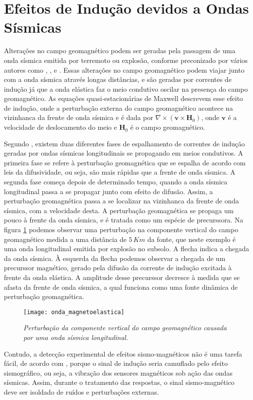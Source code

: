 \section{Efeitos de Indu\c{c}\~ao devidos a Ondas S\'ismicas}

Altera\c{c}\~oes no campo geomagn\'etico podem ser geradas  pela passagem de uma onda s\'ismica emitida por terremoto ou explos\~ao, conforme preconizado por v\'arios autores como \cite{knopoff_55}, \cite{eringen_1963}, \cite{guglielmi_86a} e \cite{guglielmi_86b}. Essas altera\c{c}\~oes no campo geomagn\'etico podem viajar junto com a onda s\'ismica atrav\'es longas dist\^ancias, e s\~ao geradas por correntes de indu\c{c}\~ao j\'a que a onda el\'astica faz o meio condutivo oscilar na presen\c{c}a do campo geomagn\'etico. As equa\c{c}\~oes quasi-estacion\'arias de Maxwell descrevem esse efeito de indu\c{c}\~ao, onde a perturba\c{c}\~ao externa do campo geomagn\'etico acontece na vizinhanca da frente de onda s\'ismica e \'e dada por $\nabla\times(\mathbf{v}\times\mathbf{H}_0)$, onde $\mathbf{v}$ \'e a velocidade de deslocamento do meio e $\mathbf{H}_0$ \'e o campo geomagn\'etico. 

Segundo \cite{surkov_89b}, existem duas diferentes fases de espalhamento de correntes de indu\c{c}\~ao geradas por ondas s\'ismicas longitudinais se propagando em meios condutivos. A primeira fase se refere \`a perturba\c{c}\~ao geomagn\'etica que se espalha de acordo com leis da difusividade, ou seja, s\~ao mais r\'apidas que a frente de onda s\'ismica. A segunda fase come\c{c}a depois de determinado tempo, quando a onda s\'ismica longitudinal passa a se propagar junto com efeito de difus\~ao. Assim, a perturba\c{c}\~ao geomagn\'etica passa a se localizar na vizinhanca da frente de onda s\'ismica, com a velocidade desta. A perturba\c{c}\~ao geomagn\'etica se propaga um pouco \`a frente da onda s\'ismica, e \'e tratada como um esp\'ecie de precurssora. Na figura \ref{fig.onda_magnetoelastica} podemos observar uma perturba\c{c}\~ao na componente vertical do campo geomagn\'etico medida a uma dist\^ancia de $5\,Km$ da fonte, que neste exemplo \'e uma onda longitudinal emitida por explos\~ao no subsolo. A flecha indica a chegada da onda s\'ismica. \`A esquerda da flecha podemos observar a chegada de um precurssor magn\'etico, gerado pela difus\~ao da corrente de indu\c{c}\~ao excitada \`a frente da onda el\'astica. A amplitude desse precurssor decresce \`a medida que se afasta da frente de onda s\'ismica, a qual funciona como uma fonte din\^amica de perturba\c{c}\~ao geomagn\'etica.
\begin{figure}
\centering
\texttt{[image: onda\_magnetoelastica]}
\caption{\textit{Perturba\c{c}\~ao da componente vertical do campo geomagn\'etico causada por uma onda s\'ismica longitudinal.}}
\label{fig.onda_magnetoelastica}
\end{figure}
Contudo, a detec\c{c}\~ao experimental de efeitos sismo-magn\'eticos n\~ao \'e uma tarefa f\'acil, de acordo com \cite{surkov_97}, porque o sinal de indu\c{c}\~ao seria camuflado pelo efeito sismogr\'afico, ou seja, a vibra\c{c}\~ao dos sensores magn\'eticos sob a\c{c}\~ao das ondas s\'ismicas. Assim, durante o tratamento das respostas, o sinal sismo-magn\'etico deve ser isoldado de ru\'idos e perturba\c{c}\~oes externas.

